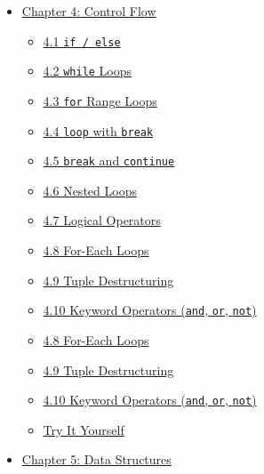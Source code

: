 \documentclass[
  english,
]{book}
\providecommand{\tightlist}{%
  \setlength{\itemsep}{0pt}\setlength{\parskip}{0pt}}
\begin{document}
\begin{itemize}
  \begin{itemize}
  \tightlist
  \item
    \hyperref[31-defining-functions]{3.1 Defining Functions}
  \item
    \hyperref[32-tail-expressions-no-return-needed]{3.2 Tail Expressions
    (No \texttt{return} Needed)}
  \item
    \hyperref[33-early-return]{3.3 Early Return}
  \item
    \hyperref[34-recursive-functions]{3.4 Recursive Functions}
  \item
    \hyperref[35-public-functions]{3.5 Public Functions}
  \item
    \hyperref[36-default-parameters]{3.6 Default Parameters}
  \item
    \hyperref[37-functions-as-first-class-values]{3.7 Functions as
    First-Class Values}
  \item
    \hyperref[try-it-yourself]{Try It Yourself}
  \end{itemize}
\item
  \hyperref[chapter-4-control-flow]{Chapter 4: Control Flow}

  \begin{itemize}
  \tightlist
  \item
    \hyperref[41-if--else]{4.1 \texttt{if\ /\ else}}
  \item
    \hyperref[42-while-loops]{4.2 \texttt{while} Loops}
  \item
    \hyperref[43-for-range-loops]{4.3 \texttt{for} Range Loops}
  \item
    \hyperref[44-loop-with-break]{4.4 \texttt{loop} with \texttt{break}}
  \item
    \hyperref[45-break-and-continue]{4.5 \texttt{break} and
    \texttt{continue}}
  \item
    \hyperref[46-nested-loops]{4.6 Nested Loops}
  \item
    \hyperref[47-logical-operators]{4.7 Logical Operators}
  \item
    \hyperref[48-for-each-loops]{4.8 For-Each Loops}
  \item
    \hyperref[49-tuple-destructuring]{4.9 Tuple Destructuring}
  \item
    \hyperref[410-keyword-operators-and-or-not]{4.10 Keyword Operators
    (\texttt{and}, \texttt{or}, \texttt{not})}
  \item
    \hyperref[48-for-each-loops]{4.8 For-Each Loops}
  \item
    \hyperref[49-tuple-destructuring]{4.9 Tuple Destructuring}
  \item
    \hyperref[410-keyword-operators-and-or-not]{4.10 Keyword Operators
    (\texttt{and}, \texttt{or}, \texttt{not})}
  \item
    \hyperref[try-it-yourself]{Try It Yourself}
  \end{itemize}
\item
  \hyperref[chapter-5-data-structures]{Chapter 5: Data Structures}


\end{itemize}
\end{document}
